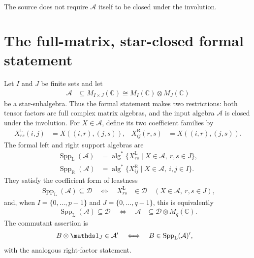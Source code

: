 \documentclass[11pt]{article}
\begin{document}
The source does not require $\mathcal A$ itself to be closed under the
involution.

\section{The full-matrix, star-closed formal statement}

Let $I$ and $J$ be finite sets and let
\begin{align}
    \mathcal A&\subseteq M_{I\times J}(\mathbb C)
      \cong M_I(\mathbb C)\otimes M_J(\mathbb C)
\end{align}
be a star-subalgebra. Thus the formal statement makes two restrictions: both
tensor factors are full complex matrix algebras, and the input algebra
$\mathcal A$ is closed under the involution. For $X\in\mathcal A$, define its
two coefficient families by
\begin{align}
    X^{\mathrm L}_{rs}(i,j)&=X((i,r),(j,s)), &
    X^{\mathrm R}_{ij}(r,s)&=X((i,r),(j,s)).
\end{align}
The formal left and right support algebras are
\begin{align}
    \operatorname{Spp}_{\mathrm L}(\mathcal A)
      &=\operatorname{alg}^*
        \{X^{\mathrm L}_{rs}\mid X\in\mathcal A,\ r,s\in J\}, \\
    \operatorname{Spp}_{\mathrm R}(\mathcal A)
      &=\operatorname{alg}^*
        \{X^{\mathrm R}_{ij}\mid X\in\mathcal A,\ i,j\in I\}.
    \label{eq:gnvw_scope_matrix_supports}
\end{align}
They satisfy the coefficient form of leastness
\begin{align}
    \operatorname{Spp}_{\mathrm L}(\mathcal A)\subseteq\mathcal D
    \quad\Longleftrightarrow\quad
    X^{\mathrm L}_{rs}&\in\mathcal D
    \quad
    (X\in\mathcal A,\ r,s\in J),
    \label{eq:gnvw_scope_matrix_least}
\end{align}
and, when $I=\{0,\ldots,p-1\}$ and $J=\{0,\ldots,q-1\}$, this is equivalently
\begin{align}
    \operatorname{Spp}_{\mathrm L}(\mathcal A)\subseteq\mathcal D
    \quad\Longleftrightarrow\quad
    \mathcal A&\subseteq\mathcal D\otimes M_q(\mathbb C).
    \label{eq:gnvw_scope_matrix_tensor_least}
\end{align}
The commutant assertion is
\begin{align}
    B\otimes\Id_J\in\mathcal A'
    \quad\Longleftrightarrow\quad
    B&\in\operatorname{Spp}_{\mathrm L}(\mathcal A)',
    \label{eq:gnvw_scope_matrix_commutant}
\end{align}
with the analogous right-factor statement.
\end{document}
